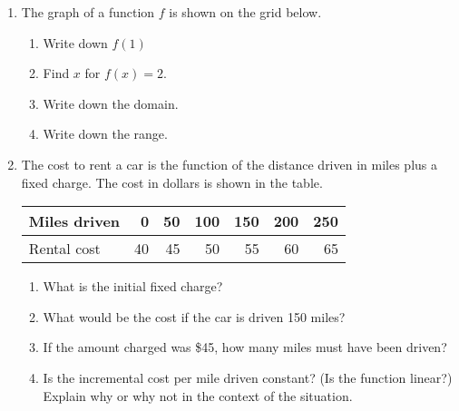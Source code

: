 \documentclass[12pt, twoside]{article}
\begin{document}
\begin{enumerate}
\newpage
\item The graph of a function $f$ is shown on the grid below.
\begin{multicols}{2}
\begin{enumerate}
  \item Write down $f(1)$
  \item Find $x$ for $f(x)=2$.
  \vspace{0.25cm}
  \item Write down the domain.
  \item Write down the range. \vspace{1cm}
\end{enumerate}
\end{multicols}
\vspace{0.5cm}

\item The cost to rent a car is the function of the distance driven in miles plus a fixed charge. The cost in dollars is shown in the table.
\begin{center}
  \begin{tabular}{|l|r|r|r|r|r|r|}
    \hline
    Miles driven & 0 & 50 & 100 & 150 & 200 & 250\\ 
    \hline 
    Rental cost & 40 & 45 & 50 & 55 & 60 & 65\\ 
    \hline 
  \end{tabular}
\end{center}
\begin{enumerate}[itemsep=1cm]
  \item What is the initial fixed charge?
  \item What would be the cost if the car is driven 150 miles?
  \item If the amount charged was \$45, how many miles must have been driven?
  \item Is the incremental cost per mile driven constant? (Is the function linear?) Explain why or why not in the context of the situation.
\end{enumerate}


\end{enumerate}
\end{document}
